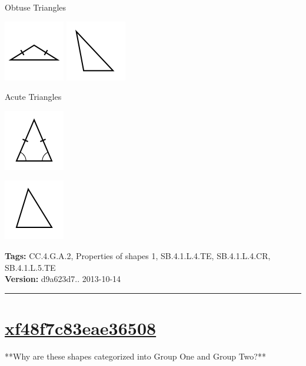 \documentclass[twocolumn,10pt]{article}
\def\shrinkfactor{0.55}
\begin{document}
Obtuse Triangles


\includegraphics[scale=\shrinkfactor]{figures/ab33a8ea9f6040b7277f725f46c6d9452ab8fbbc.png} 
\includegraphics[scale=\shrinkfactor]{figures/2d844a51b839d81f30ea0fd7869869c78159abd0.png}

Acute Triangles


\includegraphics[scale=\shrinkfactor]{figures/dc310510e56d5d165e56b2b2a168163c503fe100.png}

\includegraphics[scale=\shrinkfactor]{figures/ee7f87a00acb47dec4f2b2eed9a6741b21afc47d.png}



\medskip
\noindent
\textbf{Tags:} {\footnotesize CC.4.G.A.2, Properties of shapes 1, SB.4.1.L.4.TE, SB.4.1.L.4.CR, SB.4.1.L.5.TE}\\
\textbf{Version:} d9a623d7.. 2013-10-14
\smallskip\hrule





\section{\href{https://www.khanacademy.org/devadmin/content/items/xf48f7c83eae36508}{xf48f7c83eae36508}}

\noindent
**Why are these shapes categorized into Group One and Group Two?**
\end{document}
